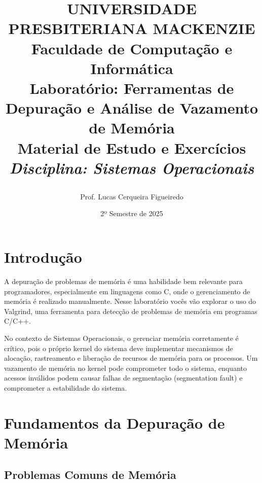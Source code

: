 \documentclass[11pt,a4paper]{article}
\title{%
    \vspace{-1.5cm}
    \begin{center}
    \end{center}
    \vspace{0.5cm}
    {\LARGE\bfseries UNIVERSIDADE PRESBITERIANA MACKENZIE}\\
    {\large Faculdade de Computação e Informática}\\
    \vspace{1.0cm}
    {\Huge\bfseries\color{mackblue} Laboratório: Ferramentas de Depuração e Análise de Vazamento de Memória}\\
    \vspace{0.5cm}
    {\LARGE\bfseries Material de Estudo e Exercícios}\\
    \vspace{0.3cm}
    {\large\itshape Disciplina: Sistemas Operacionais}
}
\author{{\large Prof. Lucas Cerqueira Figueiredo}}
\date{{\large 2º Semestre de 2025}}
\begin{document}
\maketitle
\thispagestyle{empty}

\tableofcontents
\newpage

\section{Introdução}

A depuração de problemas de memória é uma habilidade bem relevante para programadores, especialmente em linguagens como C, onde o gerenciamento de memória é realizado manualmente. Nesse laboratório vocês vão explorar o uso do Valgrind, uma ferramenta para detecção de problemas de memória em programas C/C++.

No contexto de Sistemas Operacionais, o gerenciar memória corretamente é crítico, pois o próprio kernel do sistema deve implementar mecanismos de alocação, rastreamento e liberação de recursos de memória para os processos. Um vazamento de memória no kernel pode comprometer todo o sistema, enquanto acessos inválidos podem causar falhas de segmentação (segmentation fault) e comprometer a estabilidade do sistema.

\section{Fundamentos da Depuração de Memória}

\subsection{Problemas Comuns de Memória}
\end{document}
